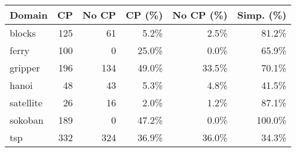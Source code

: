 \begin{tabular}{l|rr|rr|r}
	\toprule
	Domain & CP & No CP & CP (\%) & No CP (\%) & Simp. (\%) \\ 
	\midrule 
	blocks & 125 & 61 & 5.2\% & 2.5\% & 81.2\% \\ 
	ferry & 100 & 0 & 25.0\% & 0.0\% & 65.9\% \\ 
	gripper & 196 & 134 & 49.0\% & 33.5\% & 70.1\% \\ 
	hanoi & 48 & 43 & 5.3\% & 4.8\% & 41.5\% \\ 
	satellite & 26 & 16 & 2.0\% & 1.2\% & 87.1\% \\ 
	sokoban & 189 & 0 & 47.2\% & 0.0\% & 100.0\% \\ 
	tsp & 332 & 324 & 36.9\% & 36.0\% & 34.3\% \\ 
	\bottomrule
\end{tabular}